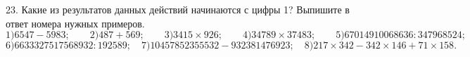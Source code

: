 23. Какие из результатов данных действий начинаются с цифры 1? Выпишите в ответ номера нужных примеров.\\
$1)6547-5983;\qquad 2)487+569;\qquad 3)3415\times926;\qquad 4)34789\times37483;\qquad5) 67014910068636:347968524;$
$6)6633327517568932:192589;\quad7)10457852355532-932381476923;\quad8)217\times342-342\times146+71\times158.$\\
